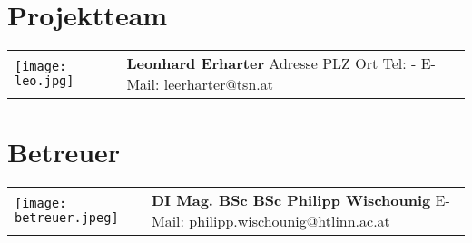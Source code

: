 \section*{Projektteam}
\label{proteam}

\begin{tabular}[t]{p{2cm} p{5cm}}
    \vspace{0pt}
    \texttt{[image: leo.jpg]}
    &
    \vspace{0pt}
    \textbf{Leonhard Erharter} 
    \newline Adresse
    \newline PLZ Ort
    \newline
    \newline Tel: -
    \newline E-Mail: leerharter@tsn.at
    \\
\end{tabular}

\section*{Betreuer}

\begin{tabular}[t]{p{2cm} p{5cm}}
    \vspace{0pt}
    \texttt{[image: betreuer.jpeg]}
    &
    \vspace{0pt}
    \textbf{DI Mag. BSc BSc Philipp Wischounig}
    \newline
    \newline E-Mail: 
    \newline philipp.wischounig@htlinn.ac.at
    \\
\end{tabular} 

\newpage